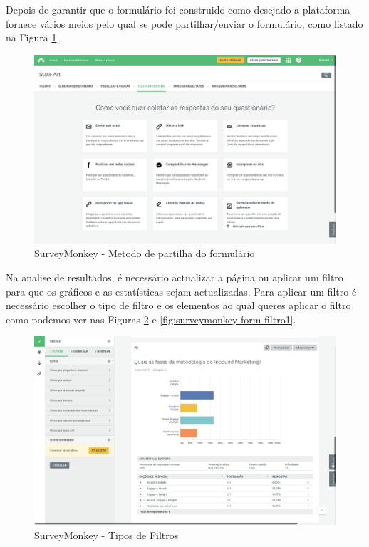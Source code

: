 Depois de garantir que o formulário foi construido como desejado a plataforma fornece vários meios pelo qual se pode partilhar/enviar o formulário, como listado na Figura \ref{fig:surveymonkey-form-share}.

\newpage

\begin{figure}[ht!]
	\begin{center}
		\includegraphics[width=1\textwidth]{img/surveymonkey-form-share}
		\caption{SurveyMonkey - Metodo de partilha do formulário }
		\label{fig:surveymonkey-form-share}
	\end{center}
\end{figure}

Na analise de resultados, é necessário actualizar a página ou aplicar um filtro para que os gráficos e as estatísticas sejam actualizadas. Para aplicar um filtro é necessário escolher o tipo de filtro e os elementos ao qual queres aplicar o filtro como podemos ver nas Figuras \ref{fig:surveymonkey-form-filtro} e \ref{fig:surveymonkey-form-filtro1}.


\begin{figure}[ht!]
	\begin{center}
		\includegraphics[width=1\textwidth]{img/surveymonkey-form-filtro}
		\caption{SurveyMonkey - Tipos de Filtros }
		\label{fig:surveymonkey-form-filtro}
	\end{center}
\end{figure}

